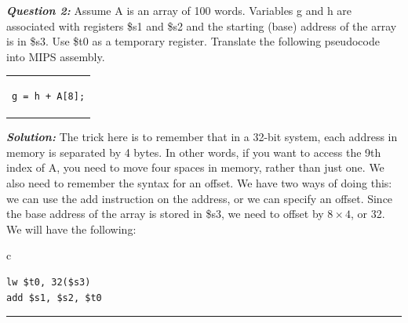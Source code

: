 \documentclass{article}
\begin{document}
\indent \textit{\textbf{Question 2:}} Assume A is an array of 100 words. Variables g and h are associated with registers \$s1 and \$s2 and the starting (base) address of the array is in \$s3. Use \$t0 as a temporary register. Translate the following pseudocode into MIPS assembly.
\begin{center} 
\begin{tabular}{c}
\begin{lstlisting}
g = h + A[8];
\end{lstlisting}
\end{tabular}
\end{center}
\noindent \textit{\textbf{Solution:}} The trick here is to remember that in a 32-bit system, each address in memory is separated by 4 bytes. In other words, if you want to access the 9th index of A, you need to move four spaces in memory, rather than just one. We also need to remember the syntax for an offset. We have two ways of doing this: we can use the add instruction on the address, or we can specify an offset. Since the base address of the array is stored in \$s3, we need to offset by $8 \times 4$, or 32. We will have the following:
\begin{center} 
\begin{tabular}{c}
\begin{lstlisting}
lw $t0, 32($s3)
add $s1, $s2, $t0
\end{lstlisting}
\end{tabular}
\end{center}
\hrule
\noindent \\
\end{document}
